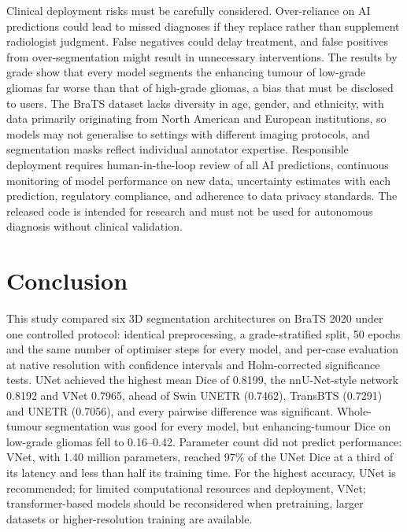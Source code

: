 \documentclass[final,3p,times,number]{elsarticle}
\begin{document}
Clinical deployment risks must be carefully considered. Over-reliance on AI predictions could lead to missed diagnoses if they replace rather than supplement radiologist judgment. False negatives could delay treatment, and false positives from over-segmentation might result in unnecessary interventions. The results by grade show that every model segments the enhancing tumour of low-grade gliomas far worse than that of high-grade gliomas, a bias that must be disclosed to users. The BraTS dataset lacks diversity in age, gender, and ethnicity, with data primarily originating from North American and European institutions, so models may not generalise to settings with different imaging protocols, and segmentation masks reflect individual annotator expertise. Responsible deployment requires human-in-the-loop review of all AI predictions, continuous monitoring of model performance on new data, uncertainty estimates with each prediction, regulatory compliance, and adherence to data privacy standards. The released code is intended for research and must not be used for autonomous diagnosis without clinical validation.

\section{Conclusion}

This study compared six 3D segmentation architectures on BraTS 2020 under one controlled protocol: identical preprocessing, a grade-stratified split, 50 epochs and the same number of optimiser steps for every model, and per-case evaluation at native resolution with confidence intervals and Holm-corrected significance tests. UNet achieved the highest mean Dice of 0.8199, the nnU-Net-style network 0.8192 and VNet 0.7965, ahead of Swin UNETR (0.7462), TransBTS (0.7291) and UNETR (0.7056), and every pairwise difference was significant. Whole-tumour segmentation was good for every model, but enhancing-tumour Dice on low-grade gliomas fell to 0.16--0.42. Parameter count did not predict performance: VNet, with 1.40 million parameters, reached 97\% of the UNet Dice at a third of its latency and less than half its training time. For the highest accuracy, UNet is recommended; for limited computational resources and deployment, VNet; transformer-based models should be reconsidered when pretraining, larger datasets or higher-resolution training are available.
\end{document}

